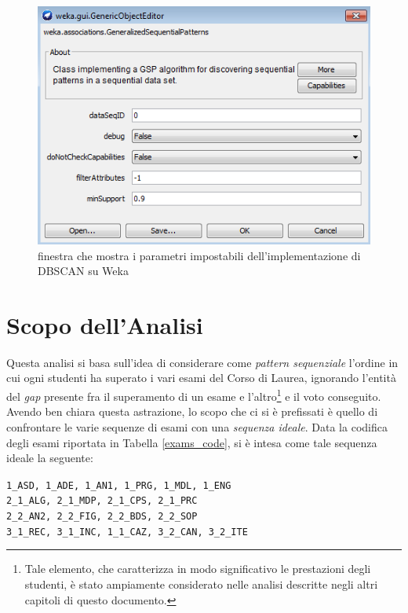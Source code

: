     \begin{figure}
        \centering
        \caption{finestra che mostra i parametri impostabili dell'implementazione di DBSCAN su Weka}
        \label{gsp_weka}
        \includegraphics[scale=0.75]{img/gsp.png}
    \end{figure}

\section{Scopo dell'Analisi}

    Questa analisi si basa sull'idea di considerare come \textit{pattern sequenziale} l'ordine in cui ogni studenti ha superato i vari esami del Corso di Laurea, ignorando l'entità del \textit{gap} presente fra il superamento di un esame e l'altro\footnote{Tale elemento, che caratterizza in modo significativo le prestazioni degli studenti, è stato ampiamente considerato nelle analisi descritte negli altri capitoli di questo documento.} e il voto conseguito.\\

    Avendo ben chiara questa astrazione, lo scopo che ci si è prefissati è quello di confrontare le varie sequenze di esami con una \textit{sequenza ideale}. Data la codifica degli esami riportata in Tabella \ref{exams_code}, si è intesa come tale sequenza ideale la seguente: \\

    \begin{centering}
        \texttt{1\_ASD, 1\_ADE, 1\_AN1, 1\_PRG, 1\_MDL, 1\_ENG} \\
        \texttt{2\_1\_ALG, 2\_1\_MDP, 2\_1\_CPS, 2\_1\_PRC} \\
        \texttt{2\_2\_AN2, 2\_2\_FIG, 2\_2\_BDS, 2\_2\_SOP} \\
        \texttt{3\_1\_REC, 3\_1\_INC, 1\_1\_CAZ, 3\_2\_CAN, 3\_2\_ITE} \\
    \end{centering}

